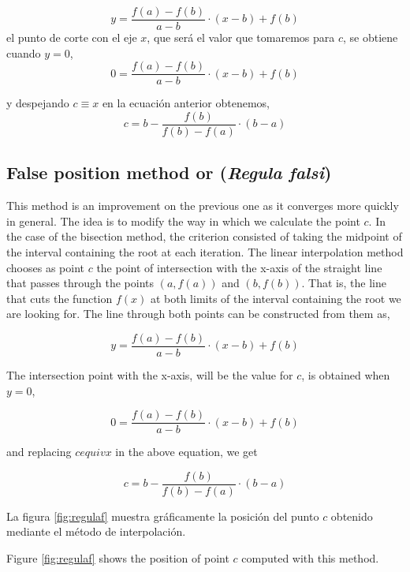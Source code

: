 \begin{paracol}{2}
\begin{equation*}
y=\frac{f(a)-f(b)}{a-b}\cdot(x-b)+f(b)
\end{equation*}
el punto de corte con el eje $x$, que será el valor que tomaremos para $c$, se obtiene cuando $y=0$,
\begin{equation*}
0=\frac{f(a)-f(b)}{a-b}\cdot(x-b)+f(b)
\end{equation*}

y despejando $c\equiv x$ en la ecuación anterior obtenemos,
\begin{equation*}
c=b-\frac{f(b)}{f(b)-f(a)}\cdot(b-a)
\end{equation*}

\switchcolumn

\subsection{False position method or (\emph{Regula falsi})}

This method is an improvement on the previous one as it converges more quickly in general. The idea is to modify the way in which we calculate the point $c$. In the case of the bisection method, the criterion consisted of taking the midpoint of the interval containing the root at each iteration. The linear interpolation method chooses as point $c$ the point of intersection with the x-axis of the straight line that passes through the points $\left(a,f(a)\right)$ and $\left(b,f(b)\right)$. That is, the line that cuts the function $f(x)$ at both limits of the interval containing the root we are looking for. The line through both points can be constructed from them as,

\begin{equation*}
y=\frac{f(a)-f(b)}{a-b}\cdot(x-b)+f(b)
\end{equation*}

The intersection point with the x-axis, will be the value for $c$, is obtained when $y=0$,

\begin{equation*}
0=\frac{f(a)-f(b)}{a-b}\cdot(x-b)+f(b)
\end{equation*}

and replacing $cequiv x$ in the above equation, we get

\begin{equation*}
c=b-\frac{f(b)}{f(b)-f(a)}\cdot(b-a)
\end{equation*}

\switchcolumn
La figura \ref{fig:regulaf} muestra  gráficamente la posición del punto $c$ obtenido mediante el método de interpolación.

\switchcolumn
Figure \ref{fig:regulaf} shows the position of point $c$ computed with this method.
\end{paracol}

